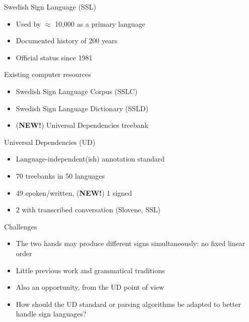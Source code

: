 \documentclass[final]{beamer}
\begin{document}
\begin{frame}{}
    \vfill
    \begin{columns}[t]
        \begin{column}{.48\linewidth}

            \begin{block}{\large Swedish Sign Language (SSL)}
                \begin{itemize}
                    \item Used by $\approx$ 10,000 as a primary language
                    \item Documented history of 200 years
                    \item Official status since 1981
                \end{itemize}
            \end{block}

            \begin{block}{\large Existing computer resources}
                \begin{itemize}
                    \item Swedish Sign Language Corpus (SSLC)
                    \item Swedish Sign Language Dictionary (SSLD)
                    \item (\textbf{NEW!}) Universal Dependencies treebank
                \end{itemize}
            \end{block}

            \begin{block}{\large Universal Dependencies (UD)}
                \begin{itemize}
                    \item Language-independent(ish) annotation standard
                    \item 70 treebanks in 50 languages
                    \item 49 spoken/written, (\textbf{NEW!}) 1 signed
                    \item 2 with transcribed conversation (Slovene, SSL)
                \end{itemize}
            \end{block}

            \begin{block}{\large Challenges}
                \begin{itemize}
                    \item The two hands may produce different signs
                        simultaneously: no fixed linear order
                    \item Little previous work and grammatical traditions
                    \item Also an opportunity, from the UD point of view
                    \item How should the UD standard or parsing algorithms be
                        adapted to better handle sign languages?
                \end{itemize}
            \end{block}



\end{column}
\end{columns}
\end{frame}
\end{document}
